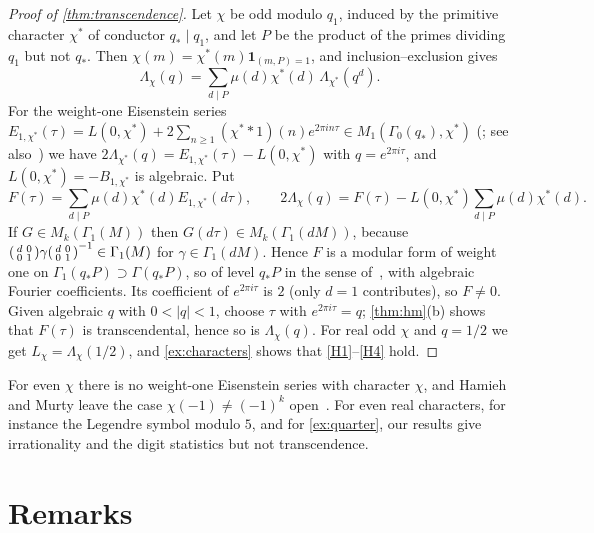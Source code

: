 \documentclass[11pt]{article}
\newcommand{\ind}{\mathbf 1}
\begin{document}
\begin{proof}[Proof of \cref{thm:transcendence}]
Let $\chi$ be odd modulo $q_1$, induced by the primitive character $\chi^*$ of
conductor $q_*\mid q_1$, and let $P$ be the product of the primes dividing $q_1$
but not $q_*$. Then $\chi(m)=\chi^*(m)\ind_{(m,P)=1}$, and inclusion--exclusion
gives
\[
\Lambda_\chi(q)=\sum_{d\mid P}\mu(d)\chi^*(d)\,\Lambda_{\chi^*}(q^d).
\]
For the weight-one Eisenstein series
$E_{1,\chi^*}(\tau)=L(0,\chi^*)+2\sum_{n\ge1}(\chi^**1)(n)e^{2\pi in\tau}
\in M_1(\Gamma_0(q_*),\chi^*)$ (\cite[\S2, p.~769]{HamiehMurty2016}; see also~\cite[\S\S4.5--4.8]{DiamondShurman})
we have $2\Lambda_{\chi^*}(q)=E_{1,\chi^*}(\tau)-L(0,\chi^*)$ with $q=e^{2\pi i\tau}$,
and $L(0,\chi^*)=-B_{1,\chi^*}$ is algebraic. Put
\[
F(\tau)=\sum_{d\mid P}\mu(d)\chi^*(d)E_{1,\chi^*}(d\tau),
\qquad 2\Lambda_\chi(q)=F(\tau)-L(0,\chi^*)\sum_{d\mid P}\mu(d)\chi^*(d).
\]
If $G\in M_k(\Gamma_1(M))$ then $G(d\tau)\in M_k(\Gamma_1(dM))$, because
$\begin{psmallmatrix}d&0\\0&1\end{psmallmatrix}\gamma\begin{psmallmatrix}d&0\\0&1\end{psmallmatrix}^{-1}\in\Gamma_1(M)$
for $\gamma\in\Gamma_1(dM)$. Hence $F$ is a modular form of weight one on
$\Gamma_1(q_*P)\supset\Gamma(q_*P)$, so of level $q_*P$ in the sense
of~\cite{HamiehMurty2016}, with algebraic Fourier coefficients. Its
coefficient of $e^{2\pi i\tau}$ is $2$ (only $d=1$ contributes), so $F\ne0$.
Given algebraic $q$ with $0<|q|<1$, choose $\tau$ with $e^{2\pi i\tau}=q$;
\cref{thm:hm}(b) shows that $F(\tau)$ is transcendental, hence so is
$\Lambda_\chi(q)$. For real odd $\chi$ and $q=1/2$ we get $L_\chi=\Lambda_\chi(1/2)$, and
\cref{ex:characters} shows that \ref{H1}--\ref{H4} hold.
\end{proof}

\begin{remark}\label{rem:even}
For even $\chi$ there is no weight-one Eisenstein series with character $\chi$,
and Hamieh and Murty leave the case $\chi(-1)\ne(-1)^k$ open~\cite[p.~767]{HamiehMurty2016}.
For even real characters, for instance the Legendre symbol modulo $5$, and for
\cref{ex:quarter}, our results give irrationality and the digit statistics but
not transcendence.
\end{remark}

\section{Remarks}\label{sec:remarks}
\end{document}
